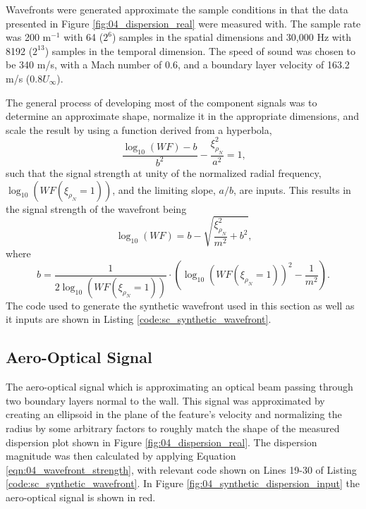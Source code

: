 Wavefronts were generated approximate the sample conditions in that the data presented in Figure \ref{fig:04_dispersion_real} were measured with.
The sample rate was 200 m$^{-1}$ with 64 ($2^6$) samples in the spatial dimensions and 30,000 Hz with 8192 ($2^{13}$) samples in the temporal dimension.
The speed of sound was chosen to be 340 m/s, with a Mach number of 0.6, and a boundary layer velocity of 163.2 m/s ($0.8U_\infty$).

The general process of developing most of the component signals was to determine an approximate shape, normalize it in the appropriate dimensions, and scale the result by using a function derived from a hyperbola,
\begin{equation}
  \frac{\log_{10}(WF)-b}{b^2}-\frac{\xi_{\rho_N}^2}{a^2} = 1 \textrm{,}
  \label{eqn:04_scaling_hyperbola}
\end{equation}
such that the signal strength at unity of the normalized radial frequency, $\log_{10}(WF(\xi_{\rho_N}=1))$, and the limiting slope, $a/b$, are inputs.
This results in the signal strength of the wavefront being
\begin{equation}
  \log_{10}(WF) = b-\sqrt{\frac{\xi_{\rho_N}^2}{m^2}+b^2} \textrm{,}
  \label{eqn:04_wavefront_strength}
\end{equation}
where
\begin{equation}
  b = \frac{1}{2\log_{10}(WF(\xi_{\rho_N}=1))}\cdot\left(\log_{10}(WF(\xi_{\rho_N}=1))^2-\frac{1}{m^2}\right) \textrm{.}
  \label{eqn:04_wavefront_strength_b}
\end{equation}
The code used to generate the synthetic wavefront used in this section as well as it inputs are shown in Listing \ref{code:sc_synthetic_wavefront}.

\subsection{Aero-Optical Signal}
The aero-optical signal which is approximating an optical beam passing through two boundary layers normal to the wall.
This signal was approximated by creating an ellipsoid in the plane of the feature's velocity and normalizing the radius by some arbitrary factors to roughly match the shape of the measured dispersion plot shown in Figure \ref{fig:04_dispersion_real}.
The dispersion magnitude was then calculated by applying Equation \ref{eqn:04_wavefront_strength}, with relevant code shown on Lines 19-30 of Listing \ref{code:sc_synthetic_wavefront}.
In Figure \ref{fig:04_synthetic_dispersion_input} the aero-optical signal is shown in red.
% 

